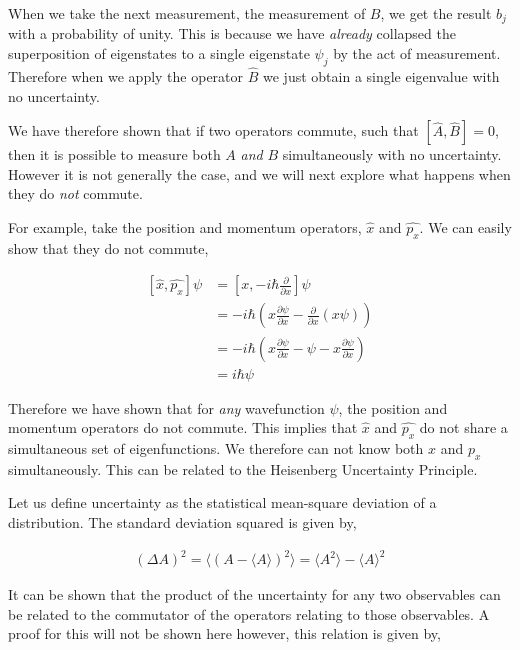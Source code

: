 \documentclass[11pt]{amsart}
\begin{document}
When we take the next measurement, the measurement of $B$, we get the result $b_j$ with a probability of unity. This is because we have \textit{already} collapsed the superposition of eigenstates to a single eigenstate $\psi_j$ by the act of measurement. Therefore when we apply the operator $\hat{B}$ we just obtain a single eigenvalue with no uncertainty.

We have therefore shown that if two operators commute, such that $\left[\hat{A}, \hat{B}\right] = 0$, then it is possible to measure both $A$ \textit{and} $B$ simultaneously with no uncertainty. However it is not generally the case, and we will next explore what happens when they do \textit{not} commute.

For example, take the position and momentum operators, $\hat{x}$ and $\hat{p_x}$. We can easily show that they do not commute,

\begin{align*}
  \left[\hat{x}, \hat{p_x}\right]\psi &= \left[x, -i\hbar\frac{\partial}{\partial x}\right]\psi \\
                                      &= -i\hbar\left(x\frac{\partial\psi}{\partial x} - \frac{\partial}{\partial x}\left(x\psi\right)\right) \\
                                      &= -i\hbar\left(x\frac{\partial\psi}{\partial x} - \psi - x\frac{\partial\psi}{\partial x}\right) \\
                                      &= i\hbar\psi
\end{align*}

Therefore we have shown that for \textit{any} wavefunction $\psi$, the position and momentum operators do not commute. This implies that $\hat{x}$ and $\hat{p_x}$ do not share a simultaneous set of eigenfunctions. We therefore can not know both $x$ and $p_x$ simultaneously. This can be related to the Heisenberg Uncertainty Principle.

Let us define uncertainty as the statistical mean-square deviation of a distribution. The standard deviation squared is given by,

\begin{align*}
  {(\Delta A)}^2 = \langle {\left(A - \langle A\rangle\right)}^2 \rangle = \langle A^2\rangle - {\langle A\rangle}^2
\end{align*}

It can be shown that the product of the uncertainty for any two observables can be related to the commutator of the operators relating to those observables. A proof for this will not be shown here however, this relation is given by,
\end{document}
